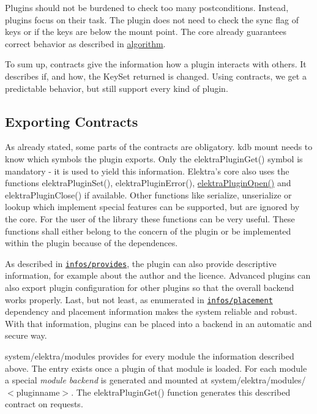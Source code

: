 Plugins should not be burdened to check too many postconditions. Instead, plugins focus on their task. The plugin does not need to check the sync flag of keys or if the keys are below the mount point. The core already guarantees correct behavior as described in \hyperlink{doc_dev_algorithm_md}{algorithm}.

To sum up, contracts give the information how a plugin interacts with others. It describes if, and how, the {\ttfamily Key\+Set} {\ttfamily returned} is changed. Using contracts, we get a predictable behavior, but still support every kind of plugin.

\subsection*{Exporting Contracts}

As already stated, some parts of the contracts are obligatory. {\ttfamily kdb mount} needs to know which symbols the plugin exports. Only the {\ttfamily elektra\+Plugin\+Get()} symbol is mandatory -\/ it is used to yield this information. Elektra’s core also uses the functions {\ttfamily elektra\+Plugin\+Set()}, {\ttfamily elektra\+Plugin\+Error()}, {\ttfamily \hyperlink{elektra_2plugin_8c_a32a70a7876542c51d153164ac5108a57}{elektra\+Plugin\+Open()}} and {\ttfamily elektra\+Plugin\+Close()} if available. Other functions like {\ttfamily serialize}, {\ttfamily unserialize} or {\ttfamily lookup} which implement special features can be supported, but are ignored by the core. For the user of the library these functions can be very useful. These functions shall either belong to the concern of the plugin or be implemented within the plugin because of the dependences.

As described in \href{/home/markus/Projekte/Elektra/current/doc/CONTRACT.ini}{\tt infos/provides}, the plugin can also provide descriptive information, for example about the author and the licence. Advanced plugins can also export plugin configuration for other plugins so that the overall backend works properly. Last, but not least, as enumerated in \href{/home/markus/Projekte/Elektra/current/doc/CONTRACT.ini}{\tt infos/placement} dependency and placement information makes the system reliable and robust. With that information, plugins can be placed into a backend in an automatic and secure way.

{\ttfamily system/elektra/modules} provides for every module the information described above. The entry exists once a plugin of that module is loaded. For each module a special {\itshape module backend} is generated and mounted at {\ttfamily system/elektra/modules/$<$pluginname$>$}. The {\ttfamily elektra\+Plugin\+Get()} function generates this described contract on requests.

